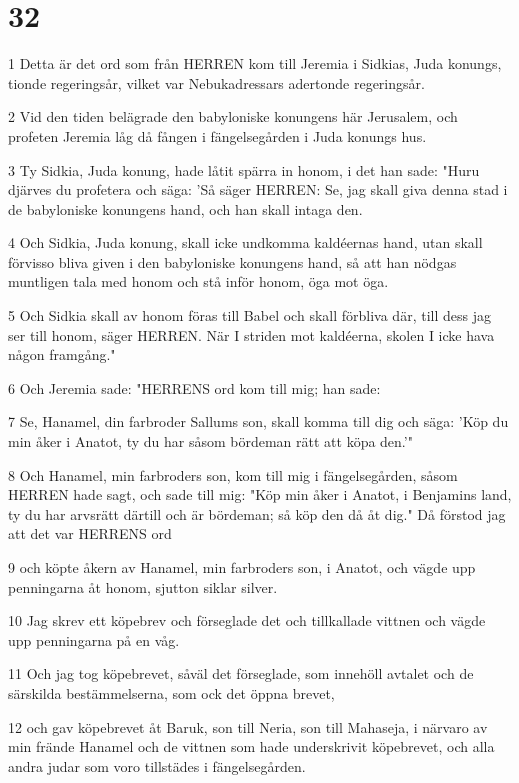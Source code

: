 \chapter{32}

\par 1 Detta är det ord som från HERREN kom till Jeremia i Sidkias, Juda konungs, tionde regeringsår, vilket var Nebukadressars adertonde regeringsår.
\par 2 Vid den tiden belägrade den babyloniske konungens här Jerusalem, och profeten Jeremia låg då fången i fängelsegården i Juda konungs hus.
\par 3 Ty Sidkia, Juda konung, hade låtit spärra in honom, i det han sade: "Huru djärves du profetera och säga: 'Så säger HERREN: Se, jag skall giva denna stad i de babyloniske konungens hand, och han skall intaga den.
\par 4 Och Sidkia, Juda konung, skall icke undkomma kaldéernas hand, utan skall förvisso bliva given i den babyloniske konungens hand, så att han nödgas muntligen tala med honom och stå inför honom, öga mot öga.
\par 5 Och Sidkia skall av honom föras till Babel och skall förbliva där, till dess jag ser till honom, säger HERREN. När I striden mot kaldéerna, skolen I icke hava någon framgång."
\par 6 Och Jeremia sade: "HERRENS ord kom till mig; han sade:
\par 7 Se, Hanamel, din farbroder Sallums son, skall komma till dig och säga: 'Köp du min åker i Anatot, ty du har såsom bördeman rätt att köpa den.'"
\par 8 Och Hanamel, min farbroders son, kom till mig i fängelsegården, såsom HERREN hade sagt, och sade till mig: "Köp min åker i Anatot, i Benjamins land, ty du har arvsrätt därtill och är bördeman; så köp den då åt dig." Då förstod jag att det var HERRENS ord
\par 9 och köpte åkern av Hanamel, min farbroders son, i Anatot, och vägde upp penningarna åt honom, sjutton siklar silver.
\par 10 Jag skrev ett köpebrev och förseglade det och tillkallade vittnen och vägde upp penningarna på en våg.
\par 11 Och jag tog köpebrevet, såväl det förseglade, som innehöll avtalet och de särskilda bestämmelserna, som ock det öppna brevet,
\par 12 och gav köpebrevet åt Baruk, son till Neria, son till Mahaseja, i närvaro av min frände Hanamel och de vittnen som hade underskrivit köpebrevet, och alla andra judar som voro tillstädes i fängelsegården.
